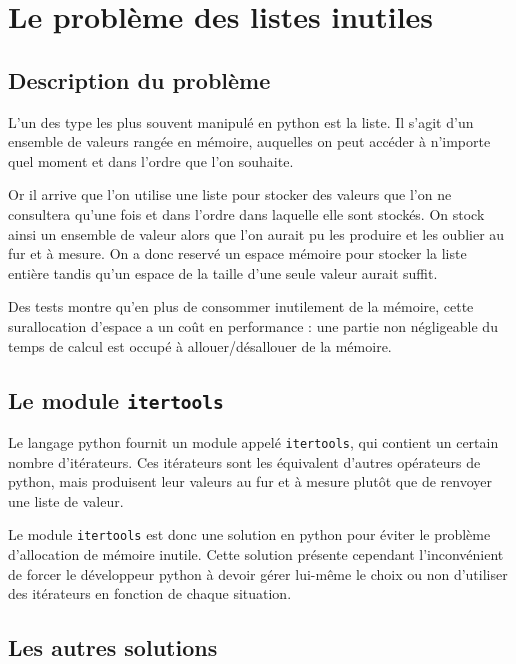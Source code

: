 \documentclass[a4paper]{article}
\begin{document}
\section*{Le problème des listes inutiles}

\subsection*{Description du problème}

L'un des type les plus souvent manipulé en python est la liste. Il
s'agit d'un ensemble de valeurs rangée en mémoire, auquelles on peut
accéder à n'importe quel moment et dans l'ordre que l'on souhaite.

Or il arrive que l'on utilise une liste pour stocker des valeurs que
l'on ne consultera qu'une fois et dans l'ordre dans laquelle elle sont
stockés. On stock ainsi un ensemble de valeur alors que l'on aurait pu
les produire et les oublier au fur et à mesure. On a donc reservé un
espace mémoire pour stocker la liste entière tandis qu'un espace de la
taille d'une seule valeur aurait suffit.

Des tests montre qu'en plus de consommer inutilement de la mémoire,
cette surallocation d'espace a un coût en performance : une partie non
négligeable du temps de calcul est occupé à allouer/désallouer de la
mémoire.

\subsection*{Le module \texttt{itertools}}

Le langage python fournit un module appelé \texttt{itertools}, qui contient un
certain nombre d'itérateurs. Ces itérateurs sont les équivalent
d'autres opérateurs de python, mais produisent leur valeurs au fur et
à mesure plutôt que de renvoyer une liste de valeur.

Le module \texttt{itertools} est donc une solution en python pour éviter le
problème d'allocation de mémoire inutile. Cette solution présente
cependant l'inconvénient de forcer le développeur python à devoir
gérer lui-même le choix ou non d'utiliser des itérateurs en fonction
de chaque situation. 

\subsection*{Les autres solutions }
\end{document}
